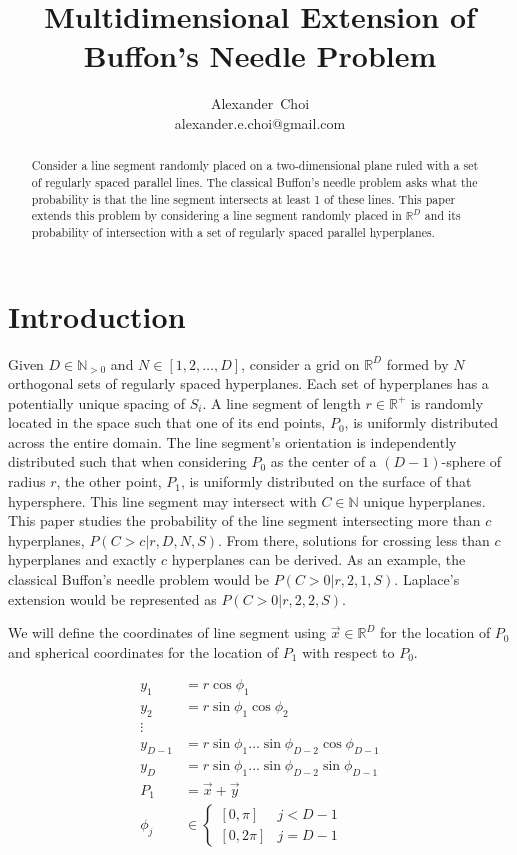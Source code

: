 \documentclass{article}
\title{Multidimensional Extension of Buffon's Needle Problem}
\author{ Alexander~Choi\\
	alexander.e.choi@gmail.com
}
\begin{document}
\maketitle

\begin{abstract}
	Consider a line segment randomly placed on a two-dimensional plane ruled with a set of regularly spaced parallel lines. The classical Buffon's needle problem
    asks what the probability is that the line segment intersects at least 1 of these lines. This paper extends this problem by considering a line segment randomly
    placed in $\mathbb{R}^D$ and its probability of intersection with a set of regularly spaced parallel hyperplanes. 
\end{abstract}



\section{Introduction}
Given $D\in\mathbb{N}_{>0}$ and $N\in[1,2,\dots,D]$, consider a grid on $\mathbb{R}^D$ formed by $N$ orthogonal sets of regularly spaced hyperplanes. Each set of hyperplanes
has a potentially unique spacing of $S_i$. A line segment of length $r\in\mathbb{R}^+$ is randomly located in the space such that one of its end points, $P_0$, is uniformly distributed
across the entire domain. The line segment's orientation is independently distributed such that when considering $P_0$ as the center of a $(D-1)$-sphere of radius $r$, the other point, $P_1$,
is uniformly distributed on the surface of that hypersphere. This line segment may intersect with $C\in\mathbb{N}$ unique hyperplanes. This paper studies the probability of
the line segment intersecting more than $c$ hyperplanes, $P(C>c|r, D, N, S)$. From there, solutions for crossing less than $c$ hyperplanes and exactly $c$ hyperplanes can
be derived.
As an example, the classical Buffon's needle problem would be $P(C>0|r, 2, 1, S)$. Laplace's extension would be represented as $P(C>0|r, 2, 2, S)$.

We will define the coordinates of line segment using $\vec{x}\in\mathbb{R}^D$ for the location of $P_0$ and spherical coordinates for the location of $P_1$ with respect to $P_0$.

\begin{align*}
    y_1 &= r\cos{\phi_1}\\
    y_2 &= r\sin{\phi_1}\cos{\phi_2}\\
    \vdots\\
    y_{D-1} &= r\sin{\phi_1}\hdots\sin{\phi_{D-2}}\cos{\phi_{D-1}}\\
    y_{D} &= r\sin{\phi_1}\hdots\sin{\phi_{D-2}}\sin{\phi_{D-1}}\\
    P_1 &= \vec{x} + \vec{y}\\
	\phi_j &\in \begin{cases}[0, \pi] & j<D-1 \\ [0, 2\pi] & j=D-1\end{cases}
\end{align*}
\end{document}
